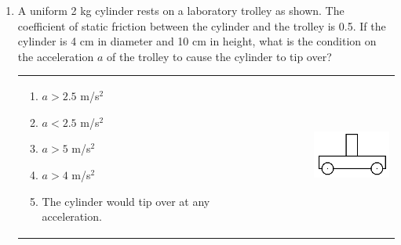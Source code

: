 \documentclass[12pt,letterpaper]{article}
\begin{document}
\begin{enumerate}[resume]

\item
A uniform 2 kg cylinder rests on a laboratory trolley as shown. The coefficient of static friction between the cylinder and the trolley is 0.5. If the cylinder is 4 cm in diameter and 10 cm in height, what is the condition on the acceleration $a$ of the trolley to cause the cylinder to tip over?

\begin{tabular}{l r}

\begin{minipage}{0.6\textwidth}
\begin{enumerate}
\item $a > 2.5$ m/s$^2$
\item $a < 2.5$ m/s$^2$
\item $a > 5$ m/s$^2$
\item $a > 4$ m/s$^2$
\item The cylinder would tip over at any acceleration.
\end{enumerate}
\end{minipage} &
\begin{minipage}{0.4\textwidth}
\includegraphics[width=0.65\textwidth,center]{trolley.png}
\end{minipage}
\end{tabular}


\end{enumerate}
\end{document}
